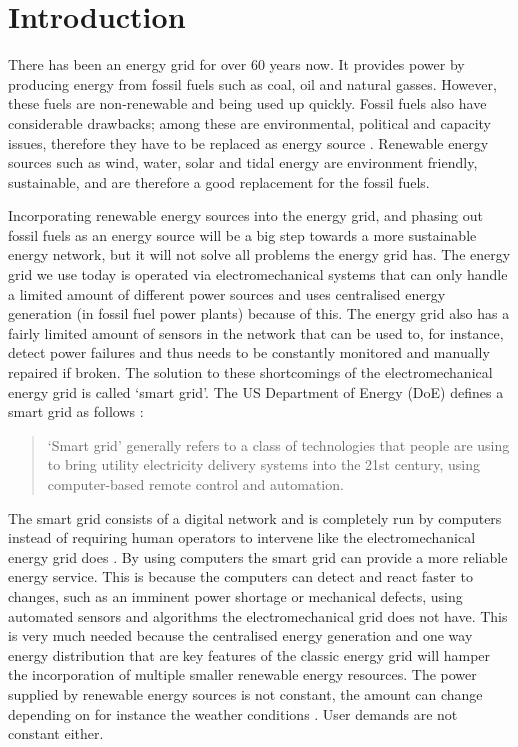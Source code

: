 \section{Introduction}\label{intro}
There has been an energy grid for over 60 years now. It provides power by producing energy from fossil fuels such as coal, oil and natural gasses. However, these fuels are non-renewable and being used up quickly. Fossil fuels also have considerable drawbacks; among these are environmental, political and capacity issues, therefore they have to be replaced as energy source \cite{friedman2008hot}. Renewable energy sources such as wind, water, solar and tidal energy \cite{Tromly2001} are environment friendly, sustainable, and are therefore a good replacement for the fossil fuels.

Incorporating renewable energy sources into the energy grid, and phasing out fossil fuels as an energy source will be a big step towards a more sustainable energy network, but it will not solve all problems the energy grid has. The energy grid we use today is operated via electromechanical systems that can only handle a limited amount of different power sources and uses centralised energy generation (in fossil fuel power plants) because of this. The energy grid also has a fairly limited amount of sensors in the network that can be used to, for instance, detect power failures and thus needs to be constantly monitored and manually repaired if broken. The solution to these shortcomings of the electromechanical energy grid is called `smart grid'. The US Department of Energy (DoE) defines a smart grid as follows \cite{doe}: 
 
\begin{quote}
`Smart grid' generally refers to a class of technologies that people are using to bring utility electricity delivery systems into the 21st century, using computer-based remote control and automation.
\end{quote}

The smart grid consists of a digital network and is completely run by computers instead of requiring human operators to intervene like the electromechanical energy grid does \cite{Moslehi2010}. By using computers the smart grid can provide a more reliable energy service. This is because the computers can detect and react faster to changes, such as an imminent power shortage or mechanical defects, using automated sensors and algorithms the electromechanical grid does not have. This is very much needed because the centralised energy generation and one way energy distribution that are key features of the classic energy grid will hamper the incorporation of multiple smaller renewable energy resources. The power supplied by renewable energy sources is not constant, the amount can change depending on for instance the weather conditions \cite{RamchurnVitelingumRogersJennings2014}. User demands are not constant either.

